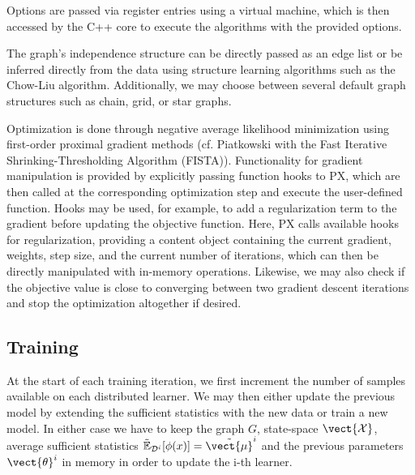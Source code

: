 Options are passed via register entries using a virtual machine, which is then accessed by the C++ core to execute the algorithms with the provided options.

The graph's independence structure can be directly passed as an edge list or be inferred directly from the data using structure learning algorithms such as the Chow-Liu algorithm.
Additionally, we may choose between several default graph structures such as chain, grid, or star graphs.

Optimization is done through negative average likelihood minimization using first-order proximal gradient methods (cf. Piatkowski \cite{piatkowski2018exponential} with the Fast Iterative Shrinking-Thresholding Algorithm (FISTA)).
Functionality for gradient manipulation is provided by explicitly passing function hooks to PX, which are then called at the corresponding optimization step and execute the user-defined function.
Hooks may be used, for example, to add a regularization term to the gradient before updating the objective function. 
Here, PX calls available hooks for regularization, providing a content object containing the current gradient, weights, step size, and the current number of iterations, which can then be directly manipulated with in-memory operations.
Likewise, we may also check if the objective value is close to converging between two gradient descent iterations and stop the optimization altogether if desired.

\subsection{Training}
At the start of each training iteration, we first increment the number of samples available on each distributed learner. 
We may then either update the previous model by extending the sufficient statistics with the new data or train a new model. 
In either case we  have to keep the graph $G$, state-space $\vect{\mathcal{X}}$, average sufficient statistics $\tilde{\mathbb{E}}_{\mathcal{D}^i}[\phi(x)] = \tilde{\vect{\mu}}^i$ and the previous parameters $\vect{\theta}^i$ in memory in order to update the i-th learner.

